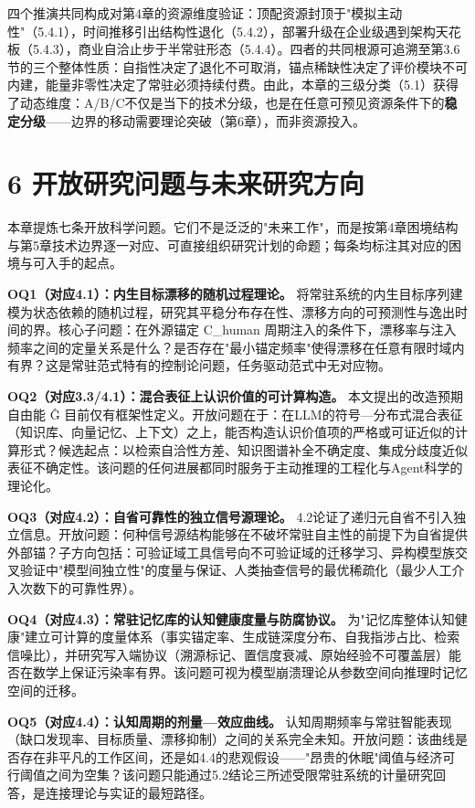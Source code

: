 \documentclass[11pt,a4paper]{ctexart}
\begin{document}
四个推演共同构成对第4章的资源维度验证：顶配资源封顶于"模拟主动性"（5.4.1），时间推移引出结构性退化（5.4.2），部署升级在企业级遇到架构天花板（5.4.3），商业自洽止步于半常驻形态（5.4.4）。四者的共同根源可追溯至第3.6节的三个整体性质：自指性决定了退化不可取消，锚点稀缺性决定了评价模块不可内建，能量非零性决定了常驻必须持续付费。由此，本章的三级分类（5.1）获得了动态维度：A/B/C不仅是当下的技术分级，也是在任意可预见资源条件下的\textbf{稳定分级}——边界的移动需要理论突破（第6章），而非资源投入。

\section{6 开放研究问题与未来研究方向}

本章提炼七条开放科学问题。它们不是泛泛的"未来工作"，而是按第4章困境结构与第5章技术边界逐一对应、可直接组织研究计划的命题；每条均标注其对应的困境与可入手的起点。

\textbf{OQ1（对应4.1）：内生目标漂移的随机过程理论。} 将常驻系统的内生目标序列建模为状态依赖的随机过程，研究其平稳分布存在性、漂移方向的可预测性与逸出时间的界。核心子问题：在外源锚定 C\_human 周期注入的条件下，漂移率与注入频率之间的定量关系是什么？是否存在"最小锚定频率"使得漂移在任意有限时域内有界？这是常驻范式特有的控制论问题，任务驱动范式中无对应物。

\textbf{OQ2（对应3.3/4.1）：混合表征上认识价值的可计算构造。} 本文提出的改造预期自由能 Ĝ 目前仅有框架性定义。开放问题在于：在LLM的符号—分布式混合表征（知识库、向量记忆、上下文）之上，能否构造认识价值项的严格或可证近似的计算形式？候选起点：以检索自洽性方差、知识图谱补全不确定度、集成分歧度近似表征不确定性。该问题的任何进展都同时服务于主动推理的工程化与Agent科学的理论化。

\textbf{OQ3（对应4.2）：自省可靠性的独立信号源理论。} 4.2论证了递归元自省不引入独立信息。开放问题：何种信号源结构能够在不破坏常驻自主性的前提下为自省提供外部锚？子方向包括：可验证域工具信号向不可验证域的迁移学习、异构模型族交叉验证中"模型间独立性"的度量与保证、人类抽查信号的最优稀疏化（最少人工介入次数下的可靠性界）。

\textbf{OQ4（对应4.3）：常驻记忆库的认知健康度量与防腐协议。} 为"记忆库整体认知健康"建立可计算的度量体系（事实锚定率、生成链深度分布、自我指涉占比、检索信噪比），并研究写入端协议（溯源标记、置信度衰减、原始经验不可覆盖层）能否在数学上保证污染率有界。该问题可视为模型崩溃理论从参数空间向推理时记忆空间的迁移。

\textbf{OQ5（对应4.4）：认知周期的剂量—效应曲线。} 认知周期频率与常驻智能表现（缺口发现率、目标质量、漂移抑制）之间的关系完全未知。开放问题：该曲线是否存在非平凡的工作区间，还是如4.4的悲观假设——"昂贵的休眠"阈值与经济可行阈值之间为空集？该问题只能通过5.2结论三所述受限常驻系统的计量研究回答，是连接理论与实证的最短路径。
\end{document}
